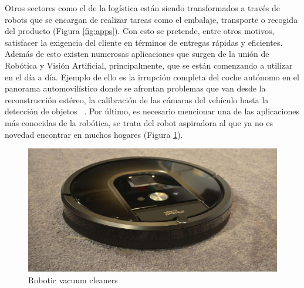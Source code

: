 \documentclass{bmvc2k}
\begin{document}
\noindent Otros sectores como el de la logística están siendo transformados a través de robots que se encargan de realizar tareas como el embalaje, transporte o recogida del producto (Figura \ref{fig:apps}). Con esto se pretende, entre otros motivos, satisfacer la exigencia del cliente en términos de entregas rápidas y eficientes. Además de esto existen numerosas aplicaciones que surgen de la unión de Robótica y Visión Artificial, principalmente, que se están comenzando a utilizar en el día a día. Ejemplo de ello es la irrupción completa del coche autónomo en el panorama automovilístico donde se afrontan problemas que van desde la reconstrucción estéreo, la calibración de las cámaras del vehículo hasta la detección de objetos ~\cite{janai2017computer}. Por último, es necesario mencionar una de las aplicaciones más conocidas de la robótica, se trata del robot aspiradora al que ya no es novedad encontrar en muchos hogares (Figura \ref{fig:roomba}).
\begin{figure}[H]
\begin{center}
\includegraphics[scale=0.20]{roomba980.jpg}
\caption{Robotic vacuum cleaners}
\label{fig:roomba}
\end{center}
\end{figure}
\end{document}
